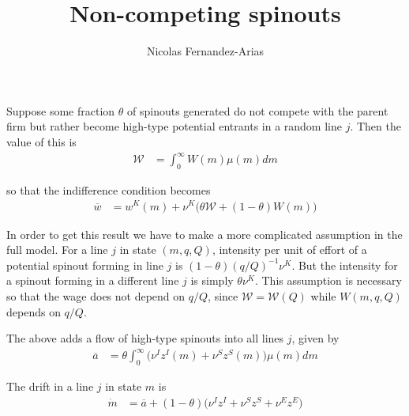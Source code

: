 \documentclass[12pt,english]{article}
\theoremstyle{remark}
\begin{document}
	
	
	
\title{Non-competing spinouts}
\author{Nicolas Fernandez-Arias}
\maketitle

Suppose some fraction $\theta$ of spinouts generated do not compete with the parent firm but rather become high-type potential entrants in a random line $j$. Then the value of this is
\begin{align*}
	\mathcal{W} &= \int_0^{\infty} W(m)\mu(m)dm
\end{align*}

so that the indifference condition becomes
\begin{align*}
	\overline{w} &= w^K(m) + \nu^K \Big( \theta \mathcal{W} + (1-\theta) W(m) \Big)
\end{align*}

In order to get this result we have to make a more complicated assumption in the full model. For a line $j$ in state $(m,q,Q)$, intensity per unit of effort of a potential spinout forming in line $j$ is $(1-\theta) (q/Q)^{-1} \nu^K$. But the intensity for a spinout forming in a different line $j$ is simply $\theta \nu^K$. This assumption is necessary so that the wage does not depend on $q/Q$, since $\mathcal{W} = \mathcal{W}(Q)$ while $W(m,q,Q)$ depends on $q/Q$.

The above adds a flow of high-type spinouts into all lines $j$, given by
\begin{align*}
	\overline{a} &= \theta \int_0^{\infty} \Big( \nu^I z^I(m) + \nu^S z^S(m) \Big) \mu(m) dm 
\end{align*}

The drift in a line $j$ in state $m$ is
\begin{align*}
	\dot{m} &= \overline{a} + (1-\theta) \Big(\nu^I z^I + \nu^S z^S + \nu^E z^E \Big) 
\end{align*}
\end{document}
